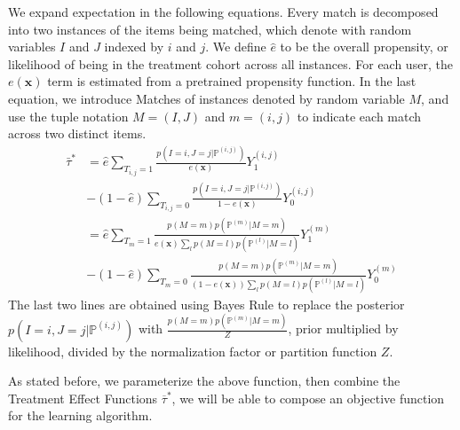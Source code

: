 \documentclass{article}
\begin{document}
We expand expectation in the following equations. Every match is decomposed into two instances of the items being matched, which denote with random variables $I$ and $J$ indexed by $i$ and $j$. We define $\hat{e}$ to be the overall propensity, or likelihood of being in the treatment cohort across all instances. For each user, the $e(\mathbf{x})$ term is estimated from a pretrained propensity function. In the last equation, we introduce Matches of instances denoted by random variable $M$, and use the tuple notation $M=(I, J)$ and $m = (i, j)$ to indicate each match across two distinct items. 
\small
\begin{align} 
\label{eq:bayes_weighted_tau} 
\bar{\tau}^{*} &= \hat{e} \sum_{T_{i,j} = 1}\frac{p( I=i, J=j | \mathbb{P}^{(i,j)})}{e(\mathbf{x})} Y_1^{(i,j)} \\ & - (1 - \hat{e}) \sum_{T_{i, j} = 0} \frac{p( I=i, J=j | \mathbb{P}^{(i, j)})}{1-e(\mathbf{x})} Y_0 ^ {(i,j)} \\ 
& = \hat{e} \sum_{T_{m} = 1} \frac{p(M=m) p(\mathbb{P}^{(m)} | M=m )}{e(\mathbf{x})\sum_l p(M=l)p(\mathbb{P}^{(l)} | M=l)} Y_1^{(m)} \\
&  - (1 - \hat{e}) \sum_{T_m = 0} \frac{p(M=m ) p(\mathbb{P}^{(m)} | M = m) }{(1-e(\mathbf{x}))\sum_l p(M=l)p(\mathbb{P}^{(l)} | M = l)}Y_0 ^ {(m)} 
\end{align} 
\normalsize 
The last two lines are obtained using Bayes Rule to replace the posterior $p( I=i, J=j | \mathbb{P}^{(i,j)})$ with $\frac{p(M=m) p(\mathbb{P}^{(m)} | M=m )}{Z} $, prior multiplied by likelihood, divided by the normalization factor or partition function $Z$. 

As stated before, we parameterize the above function, then combine the Treatment Effect Functions $\overline{\tau}^{*}$, we will be able to compose an objective function for the learning algorithm. 
\end{document}
